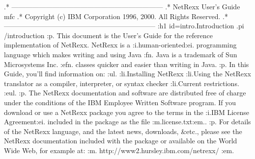 .* ------------------------------------------------------------------
.* NetRexx User's Guide                                              mfc
.* Copyright (c) IBM Corporation 1996, 2000.  All Rights Reserved.
.* ------------------------------------------------------------------
:h1 id=intro.Introduction
.pi /introduction
:p.
This document is the User's Guide for the reference implementation of
NetRexx.
NetRexx is a :i.human-oriented:ei. programming language which makes writing
and using Java
:fn.
Java is a trademark of Sun Microsystems Inc.
:efn.
classes quicker and easier than writing in Java.
:p.
In this Guide, you'll find information on:
:ul.
:li.Installing NetRexx
:li.Using the NetRexx translator as a compiler, interpreter, or syntax
checker
:li.Current restrictions.
:eul.
:p.
The NetRexx documentation and software are distributed free of charge
under the conditions of the IBM Employee Written Software program.
If you download or use a NetRexx package you agree to the terms in the
:i.IBM License Agreement:ei. included in the package as the
file :m.license.txt:em..
:p.
For details of the NetRexx language, and the latest news, downloads,
&etc., please see the NetRexx documentation included with the package or
available on the World Wide Web, for example at: :m.
http://www2.hursley.ibm.com/netrexx/
:em.
